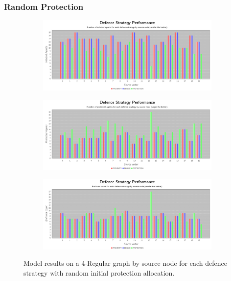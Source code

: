 \documentclass[results.tex]{subfiles}
\begin{document}
\newpage 


\subsubsection{Random Protection}



\newpage

\begin{figure}[!ht]
\centering
     \begin{subfigure}[b]{0.9\textwidth}
         \centering
         \includegraphics[width=\textwidth]{4Regular/Random/RandomInfectedChart}
         \label{fig:4reg-ran-infected}
     \end{subfigure}
     \vfill
     \begin{subfigure}[b]{0.9\textwidth}
         \centering
         \includegraphics[width=\textwidth]{4Regular/Random/RandomProtectedChart}
         \label{fig:4reg-ran-protected}
     \end{subfigure}
     \vfill
     \begin{subfigure}[b]{0.9\textwidth}
         \centering
         \includegraphics[width=\textwidth]{4Regular/Random/RandomEndTurnChart}
         \label{fig:4reg-ran-end}
     \end{subfigure}
        \caption{Model results on a 4-Regular graph by source node for each defence strategy with random initial protection allocation.}
        \label{fig:4reg-ran-charts}
\end{figure}
\end{document}
